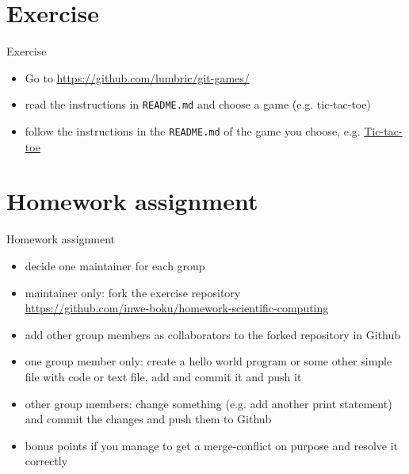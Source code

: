
\section{Exercise}

\begin{frame}[fragile]{Exercise}
    \begin{itemize}
        \item Go to \href{https://github.com/lumbric/git-games/}{https://github.com/lumbric/git-games/}
        \item read the instructions in \verb|README.md| and choose a game (e.g. tic-tac-toe)
        \item follow the instructions in the \verb|README.md| of the game you choose, e.g.
            \href{https://github.com/lumbric/git-games/tree/master/tic-tac-toe#how-to-play}{Tic-tac-toe}

    \end{itemize}
\end{frame}


\section{Homework assignment}

\begin{frame}[fragile]{Homework assignment}
    \begin{itemize}
        \item decide one maintainer for each group
        \item maintainer only: fork the exercise repository\\
            \href{https://github.com/inwe-boku/homework-scientific-computing}{https://github.com/inwe-boku/homework-scientific-computing}
        \item add other group members as collaborators to the forked repository in Github
        \item one group member only: create a hello world program or some other simple file with
            code or text file, add and commit it and push it
        \item other group members: change something (e.g. add another print statement) and commit
          the changes and push them to Github
        \item bonus points if you manage to get a merge-conflict on purpose and resolve it correctly
    \end{itemize}
\end{frame}



